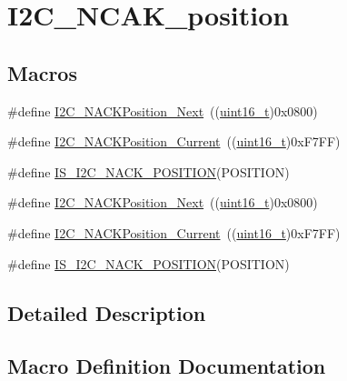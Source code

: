\hypertarget{group___i2_c___n_c_a_k__position}{}\section{I2\+C\+\_\+\+N\+C\+A\+K\+\_\+position}
\label{group___i2_c___n_c_a_k__position}
\subsection*{Macros}
\begin{DoxyCompactItemize}
\item 
\#define \hyperlink{group___i2_c___n_c_a_k__position_gacb512a4bd4841a763b6ec51606687fca}{I2\+C\+\_\+\+N\+A\+C\+K\+Position\+\_\+\+Next}~((\hyperlink{_p_e___types_8h_a1f1825b69244eb3ad2c7165ddc99c956}{uint16\+\_\+t})0x0800)
\item 
\#define \hyperlink{group___i2_c___n_c_a_k__position_ga8d91c1e62730a9d927ca8e9ec4f7ef8f}{I2\+C\+\_\+\+N\+A\+C\+K\+Position\+\_\+\+Current}~((\hyperlink{_p_e___types_8h_a1f1825b69244eb3ad2c7165ddc99c956}{uint16\+\_\+t})0x\+F7\+F\+F)
\item 
\#define \hyperlink{group___i2_c___n_c_a_k__position_ga631b4b1674a12aa2b3b27360983029e3}{I\+S\+\_\+\+I2\+C\+\_\+\+N\+A\+C\+K\+\_\+\+P\+O\+S\+I\+T\+I\+ON}(P\+O\+S\+I\+T\+I\+ON)
\item 
\#define \hyperlink{group___i2_c___n_c_a_k__position_gacb512a4bd4841a763b6ec51606687fca}{I2\+C\+\_\+\+N\+A\+C\+K\+Position\+\_\+\+Next}~((\hyperlink{_p_e___types_8h_a1f1825b69244eb3ad2c7165ddc99c956}{uint16\+\_\+t})0x0800)
\item 
\#define \hyperlink{group___i2_c___n_c_a_k__position_ga8d91c1e62730a9d927ca8e9ec4f7ef8f}{I2\+C\+\_\+\+N\+A\+C\+K\+Position\+\_\+\+Current}~((\hyperlink{_p_e___types_8h_a1f1825b69244eb3ad2c7165ddc99c956}{uint16\+\_\+t})0x\+F7\+F\+F)
\item 
\#define \hyperlink{group___i2_c___n_c_a_k__position_ga631b4b1674a12aa2b3b27360983029e3}{I\+S\+\_\+\+I2\+C\+\_\+\+N\+A\+C\+K\+\_\+\+P\+O\+S\+I\+T\+I\+ON}(P\+O\+S\+I\+T\+I\+ON)
\end{DoxyCompactItemize}


\subsection{Detailed Description}


\subsection{Macro Definition Documentation}

